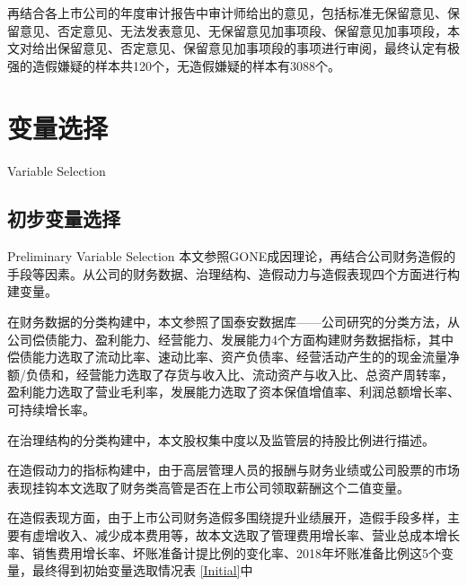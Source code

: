 再结合各上市公司的年度审计报告中审计师给出的意见，包括标准无保留意见、保留意见、否定意见、无法发表意见、无保留意见加事项段、保留意见加事项段，本文对给出保留意见、否定意见、保留意见加事项段的事项进行审阅，最终认定有极强的造假嫌疑的样本共120个，无造假嫌疑的样本有3088个。

\section{变量选择}{Variable Selection}
\subsection{初步变量选择}{Preliminary Variable Selection}
本文参照GONE成因理论，再结合公司财务造假的手段等因素。从公司的财务数据、治理结构、造假动力与造假表现四个方面进行构建变量。

在财务数据的分类构建中，本文参照了国泰安数据库——公司研究的分类方法，从公司偿债能力、盈利能力、经营能力、发展能力4个方面构建财务数据指标，其中偿债能力选取了流动比率、速动比率、资产负债率、经营活动产生的的现金流量净额/负债和，经营能力选取了存货与收入比、流动资产与收入比、总资产周转率，盈利能力选取了营业毛利率，发展能力选取了资本保值增值率、利润总额增长率、可持续增长率。

在治理结构的分类构建中，本文股权集中度以及监管层的持股比例进行描述。

在造假动力的指标构建中，由于高层管理人员的报酬与财务业绩或公司股票的市场表现挂钩\cite{Research-on-the-Influencing-Factors-of-Jin-Chao's-2013-Financial-Statement-Fraud}本文选取了财务类高管是否在上市公司领取薪酬这个二值变量。

在造假表现方面，由于上市公司财务造假多围绕提升业绩展开，造假手段多样，主要有虚增收入、减少成本费用等\cite{Zhan-Hongyan-Common-Methods}，故本文选取了管理费用增长率、营业总成本增长率、销售费用增长率、坏账准备计提比例的变化率、2018年坏账准备比例这5个变量，最终得到初始变量选取情况表 \ref{Initial}中


